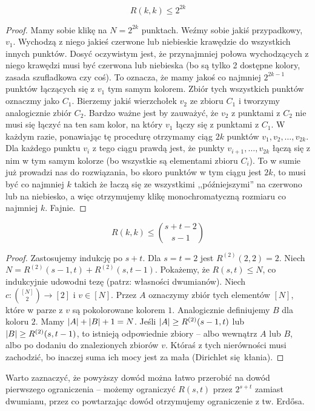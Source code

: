 \begin{theorem}[Erd\H{o}s]
	\begin{equation}
		R(k,k) \leq 2^{2k}
	\end{equation}
\end{theorem}

\begin{proof}
	Mamy sobie klikę na \(N = 2^{2k}\) punktach. Weźmy sobie jakiś przypadkowy, \(v_1\). Wychodzą z niego jakieś czerwone lub niebieskie krawędzie do wszystkich innych punktów. Dosyć oczywistym jest, że przynajmniej połowa wychodzących z niego krawędzi musi być czerwona lub niebieska (bo są tylko 2 dostępne kolory, zasada szufladkowa czy coś). To oznacza, że mamy jakoś co najmniej \(2^{2k-1}\) punktów łączących się z \(v_1\) tym samym kolorem. Zbiór tych wszystkich punktów oznaczmy jako \(C_1\). Bierzemy jakiś wierzchołek \(v_2\) ze zbioru \(C_1\) i tworzymy analogicznie zbiór \(C_2\). Bardzo ważne jest by zauważyć, że \(v_2\) z punktami z \(C_2\) nie musi się łączyć na ten sam kolor, na który \(v_1\) łączy się z punktami z \(C_1\). W każdym razie, ponawiając tę procedurę otrzymamy ciąg \(2k\) punktów \(v_1, v_2, \dots, v_{2k}\). Dla każdego punktu \(v_i\) z tego ciągu prawdą jest, że punkty \(v_{i+1}, \dots, v_{2k}\) łączą się z nim w tym samym kolorze (bo wszystkie są elementami zbioru \(C_i\)). To w sumie już prowadzi nas do rozwiązania, bo skoro punktów w tym ciągu jest \(2k\), to musi być co najmniej \(k\) takich że łaczą się ze wszystkimi ,,późniejszymi'' na czerwono lub na niebiesko, a więc otrzymujemy klikę monochromatyczną rozmiaru co najmniej \(k\). Fajnie.
\end{proof}

\begin{theorem}
	\begin{equation}
		R(k, k) \leq \binom{s+t-2}{s-1}
	\end{equation}
\end{theorem}
\begin{proof}
	Zastosujemy indukcję po \(s+t\). Dla \(s=t=2\) jest \(R^{(2)}(2,2)=2\).
	Niech \(N = R^{(2)}(s-1,t)+ R^{(2)}(s,t-1)\). Pokażemy, że \(R(s,t) \le N\), co indukcyjnie udowodni tezę (patrz: własności dwumianów).
	Niech \(c:\binom{[N]}{2} \to [2]\) i \(v\in[N]\). Przez \(A\) oznaczymy zbiór tych elementów \([N]\), które w parze z \(v\) są pokolorowane kolorem \(1\).
	Analogicznie definiujemy \(B\) dla koloru \(2\). Mamy \(\card A + \card B + 1 = N\).
	Jeśli \(\card A \ge R^{(2)}(s-1,t)\) lub \(\card B \ge R^{(2)}(s,t-1)\),
	to istnieją odpowiednie zbiory -- albo wewnątrz \(A\) lub \(B\), albo po dodaniu do znalezionych zbiorów \(v\).
	Któraś z tych nierówności musi zachodzić, bo inaczej suma ich mocy jest za mała (Dirichlet się kłania).
\end{proof}
Warto zaznaczyć, że powyższy dowód można łatwo przerobić na dowód pierwszego ograniczenia -- możemy ograniczyć
\(R(s, t)\) przez \(2^{s+t}\) zamiast dwumianu, przez co powtarzając dowód otrzymujemy ograniczenie z tw. Erd\H{o}sa.

